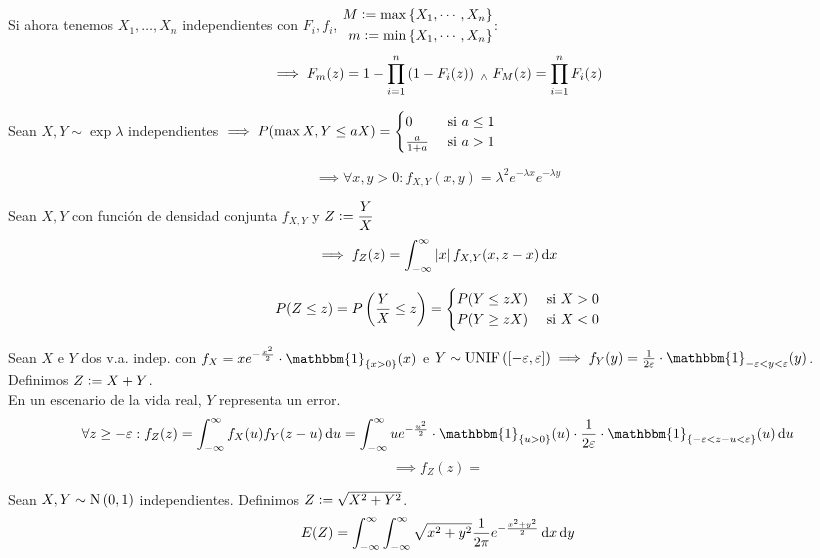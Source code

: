 Si ahora tenemos $X_1, \dots, X_n$ independientes con $F_i, f_i$, $\begin{aligned}
		M\vcentcolon= \max{\{X_1, \cdots, X_n\}} \\
		m\vcentcolon= \min{\{X_1, \cdots, X_n\}}
	\end{aligned}$:
\[\implies F_m(z) = 1-\prod_{i=1}^n \left(1- F_i(z)\right) \; _{\wedge} \; F_M(z) = \prod_{i=1}^n F_i(z)\]

 Sean $X, Y \sim \exp{\lambda}$ independientes $\displaystyle \implies P(\max{X, Y} \leq aX) = \begin{cases}
		0             & \text{ si } a \leq 1 \\
		\frac{a}{1+a} & \text{ si } a > 1
	\end{cases}$
\begin{dem}
	\[\implies \forall x, y > 0 : f_{X, Y} (x, y) = \lambda^2 e^{-\lambda x} e^{-\lambda y}\]
\end{dem}

 Sean $X, Y$ con función de densidad conjunta $f_{X, Y}$ y $\displaystyle Z\vcentcolon= \frac{Y}{X}$
\[\implies f_{Z}(z) = \int_{-\infty}^{\infty} \abs{x} f_{X, Y} (x, z-x) \odif{x}\]
\begin{dem}
	\[P(Z\leq z) = P\left(\frac{Y}{X} \leq z\right) = \begin{cases}
			P(Y \leq zX) & \text{ si } X > 0 \\
			P(Y \geq zX) & \text{ si } X < 0
		\end{cases}\]

\end{dem}

 Sean $X$ e $Y$ dos v.a. indep. con $\ds f_X = xe^{-\frac{x^2}{2}} \cdot \mathbbm{1}_{\{x>0\}}(x)$ e $Y\sim\unif{[-\varepsilon,\varepsilon]} \implies f_Y(y) =\frac{1}{2\varepsilon} \cdot \mathbbm{1}_{-\varepsilon<y<\varepsilon}(y)$. Definimos $Z\vcentcolon= X+Y$. \\
\hfill {} En un escenario de la vida real, $Y$ representa un error.
\[\forall z \geq -\varepsilon : f_Z(z) = \int_{-\infty}^{\infty} f_X(u) f_Y(z-u)\odif{u} = \int_{-\infty}^{\infty} ue^{-\frac{u^2}{2}} \cdot \mathbbm{1}_{\{u>0\}}(u)\cdot \frac{1}{2\varepsilon} \cdot \mathbbm{1}_{\{-\varepsilon<z-u<\varepsilon\}} (u) \odif{u}\]
\[\implies f_Z(z) = \]

 Sean $X, Y \sim \operatorname{N}\left(0, 1\right)$ independientes. Definimos $Z\vcentcolon= \sqrt{X^2 + Y^2}$.
\[E(Z) = \int_{-\infty}^{\infty} \int_{-\infty}^{\infty} \sqrt{x^2 + y^2} \frac{1}{2\pi} e^{-\frac{x^2+y^2}{2}} \odif{x}\odif{y}\]